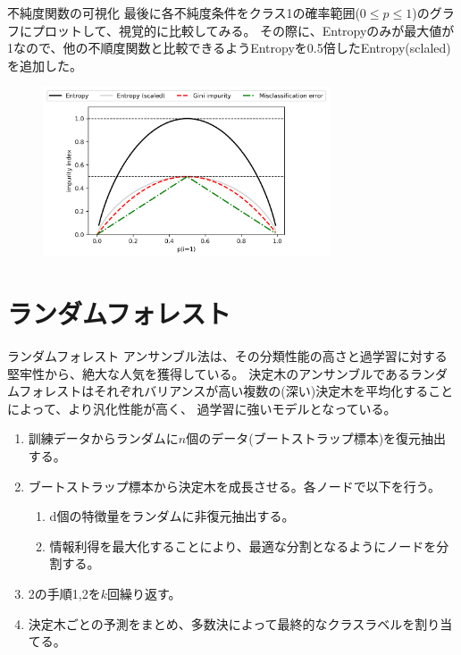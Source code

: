\documentclass[aspectratio=169, dvipdfmx, 11pt]{beamer} %
\begin{document}
\begin{frame}{不純度関数の可視化}
    最後に各不純度条件をクラス1の確率範囲(\(0\leq p \leq 1\))のグラフにプロットして、視覚的に比較してみる。
    その際に、Entropyのみが最大値が1なので、他の不順度関数と比較できるようEntropyを0.5倍したEntropy(sclaled)を追加した。
    \vspace{1em}
    \begin{figure}[b]
        \begin{center}
        \includegraphics[width=85mm]{img/day03/fig03.png}
        \end{center}
    \end{figure}
\end{frame}

\section{ランダムフォレスト}
\begin{frame}{ランダムフォレスト}
    アンサンブル法は、その分類性能の高さと過学習に対する堅牢性から、絶大な人気を獲得している。
    決定木のアンサンブルであるランダムフォレストはそれぞれバリアンスが高い複数の(深い)決定木を平均化することによって、より汎化性能が高く、
    過学習に強いモデルとなっている。
    \vspace{1em}
    \begin{enumerate}
        \item 訓練データからランダムに\(n\)個のデータ(ブートストラップ標本)を復元抽出する。
        \item ブートストラップ標本から決定木を成長させる。各ノードで以下を行う。
        \begin{enumerate}
            \item d個の特徴量をランダムに非復元抽出する。
            \item 情報利得を最大化することにより、最適な分割となるようにノードを分割する。
        \end{enumerate}
        \item 2の手順1,2を\(k\)回繰り返す。
        \item 決定木ごとの予測をまとめ、多数決によって最終的なクラスラベルを割り当てる。
    \end{enumerate}
    \vspace{1em}
\end{frame}
\end{document}

